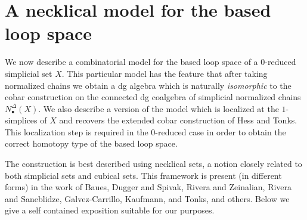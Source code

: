 \section{A necklical model for the based loop space}

We now describe a combinatorial model for the based loop space of a $0$-reduced simplicial set $X$. This particular model has the feature that after taking normalized chains we obtain a dg algebra which is naturally \textit{isomorphic} to the cobar construction on the connected dg coalgebra of simplicial normalized chains $N_\bullet^{\Delta}(X)$. We also describe a version of the model which is localized at the $1$-simplices of $X$ and recovers the extended cobar construction of Hess and Tonks. This localization step is required in the $0$-reduced case in order to obtain the correct homotopy type of the based loop space. 

The construction is best described using necklical sets, a notion closely related to both simplicial sets and cubical sets. This framework is present (in different forms) in the work of Baues, Dugger and Spivak, Rivera and Zeinalian, Rivera and Saneblidze, Galvez-Carrillo, Kaufmann, and Tonks, and others. Below we give a self contained exposition suitable for our purposes. 



